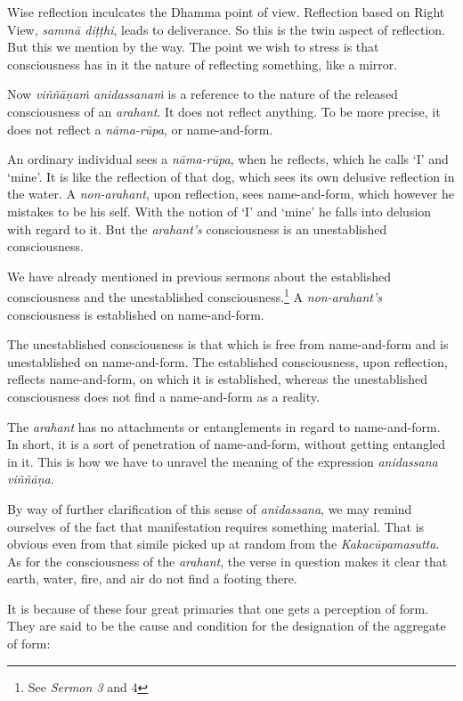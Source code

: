Wise reflection inculcates the Dhamma point of view. Reflection based on Right View, \emph{sammā diṭṭhi}, leads to deliverance. So this is the twin aspect of reflection. But this we mention by the way. The point we wish to stress is that consciousness has in it the nature of reflecting something, like a mirror.

Now \emph{viññāṇaṁ anidassanaṁ} is a reference to the nature of the released consciousness of an \emph{arahant}. It does not reflect anything. To be more precise, it does not reflect a \emph{nāma-rūpa}, or name-and-form.

An ordinary individual sees a \emph{nāma-rūpa}, when he reflects, which he calls `I' and `mine'. It is like the reflection of that dog, which sees its own delusive reflection in the water. A \emph{non-arahant}, upon reflection, sees name-and-form, which however he mistakes to be his self. With the notion of `I' and `mine' he falls into delusion with regard to it. But the \emph{arahant's} consciousness is an unestablished consciousness.

We have already mentioned in previous sermons about the established consciousness and the unestablished consciousness.\footnote{See \emph{Sermon 3} and 4} A \emph{non-arahant's} consciousness is established on name-and-form.

The unestablished consciousness is that which is free from name-and-form and is unestablished on name-and-form. The established consciousness, upon reflection, reflects name-and-form, on which it is established, whereas the unestablished consciousness does not find a name-and-form as a reality.

The \emph{arahant} has no attachments or entanglements in regard to name-and-form. In short, it is a sort of penetration of name-and-form, without getting entangled in it. This is how we have to unravel the meaning of the expression \emph{anidassana viññāṇa}.

By way of further clarification of this sense of \emph{anidassana}, we may remind ourselves of the fact that manifestation requires something material. That is obvious even from that simile picked up at random from the \emph{Kakacūpamasutta}. As for the consciousness of the \emph{arahant}, the verse in question makes it clear that earth, water, fire, and air do not find a footing there.

It is because of these four great primaries that one gets a perception of form. They are said to be the cause and condition for the designation of the aggregate of form:

